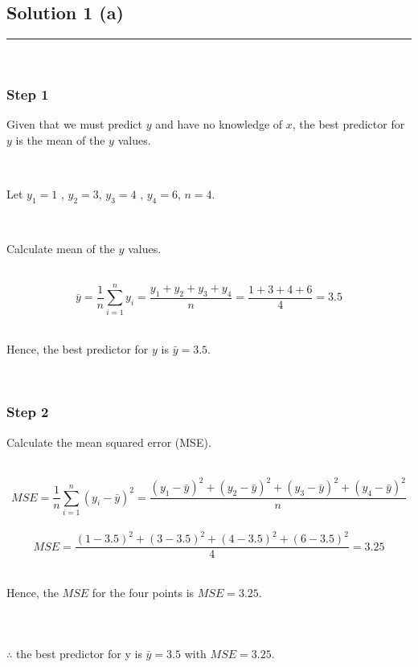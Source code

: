 \documentclass{article}
\begin{document}
\pagestyle{fancy}

\subsection*{Solution 1 (a)}
\noindent\rule{\textwidth}{0.4pt}\\

\subsubsection*{Step 1}

\parbox{\textwidth}{
Given that we must predict $y$ and have no knowledge of $x$, the best predictor for $y$ is the mean of the $y$ values.
}\\

\parbox{\textwidth}{
Let $y_1 = 1$ , $y_2 = 3$, $y_3 = 4$ , $y_4 = 6$, $n=4$.
}\\

\parbox{\textwidth}{
Calculate mean of the $y$ values.
}\\

$$\bar{y} = \frac{1}{n} \sum_{i=1}^{n} y_i= \frac{y_1+y_2+y_3+y_4}{n}=\frac{1+3+4+6}{4}=3.5$$\\

\parbox{\textwidth}{
Hence, the best predictor for $y$ is $\bar{y} = 3.5$.
}\\

\subsubsection*{Step 2}
\parbox{\textwidth}{
Calculate the mean squared error (MSE).
}\\
$$MSE = \frac{1}{n} \sum_{i=1}^{n} (y_i-\bar{y})^2  = \frac{(y_1-\bar{y})^2+(y_2-\bar{y})^2+(y_3-\bar{y})^2+(y_4-\bar{y})^2}{n}$$\\

$$MSE =\frac{(1-3.5)^2 + (3-3.5)^2 + (4-3.5)^2 + (6-3.5)^2}{4}=3.25$$\\

\parbox{\textwidth}{
Hence, the $MSE$ for the four points is $MSE = 3.25$.
}\\

\subsubsection*{\normalfont}{$\therefore$ the best predictor for y is $\bar{y} = 3.5$ with $MSE = 3.25$}.
\end{document}
